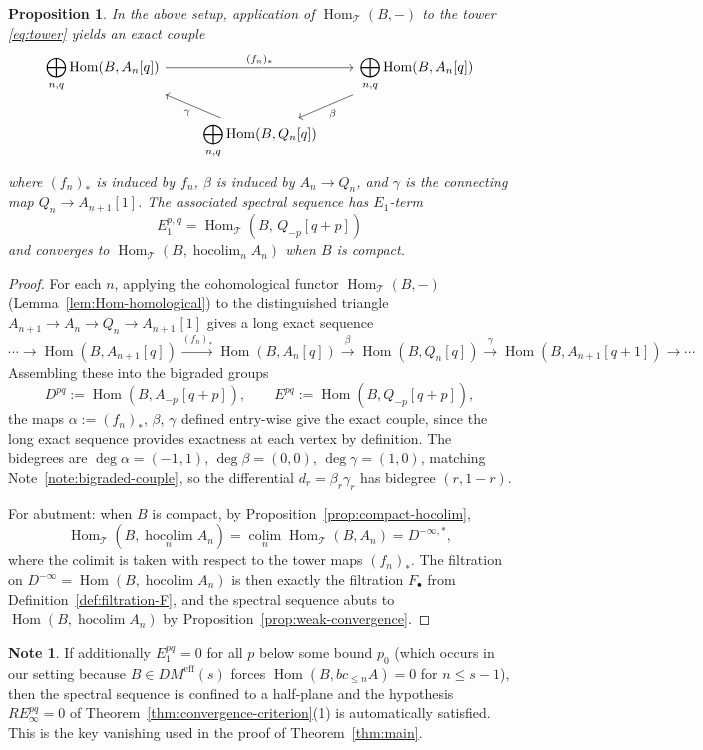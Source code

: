\documentclass[12pt,a4paper]{article}
\newtheorem{proposition}[theorem]{Proposition}
\theoremstyle{definition}
\newtheorem{note}[theorem]{Note}
\newcommand{\hocolim}{\operatorname*{hocolim}}
\newcommand{\colim}{\operatorname*{colim}}
\newcommand{\Hom}{\operatorname{Hom}}
\begin{document}
\begin{proposition}\label{prop:tower-SS}
In the above setup, application of $\Hom_{\mathcal{T}}(B,-)$ to the tower
\eqref{eq:tower} yields an exact couple
\[
\begin{tikzcd}[column sep=2.2em, row sep=1.6em]
  \displaystyle\bigoplus_{n,q}\Hom(B,A_n[q])
    \ar[rr,"(f_n)_*"] &&
  \displaystyle\bigoplus_{n,q}\Hom(B,A_n[q])
    \ar[dl,"\beta"] \\
  & \displaystyle\bigoplus_{n,q}\Hom(B,Q_n[q]) \ar[ul,"\gamma"] &
\end{tikzcd}
\]
where $(f_n)_*$ is induced by $f_n$, $\beta$ is induced by $A_n\to Q_n$, and
$\gamma$ is the connecting map $Q_n\to A_{n+1}[1]$.  The associated spectral
sequence has $E_1$-term
\[
  E_1^{p,q} = \Hom_{\mathcal{T}}(B,\,Q_{-p}[q+p])
\]
and converges to $\Hom_{\mathcal{T}}(B,\hocolim_n A_n)$ when $B$ is compact.
\end{proposition}
\begin{proof}
For each $n$, applying the cohomological functor $\Hom_\mathcal{T}(B,-)$
(Lemma~\ref{lem:Hom-homological}) to the distinguished triangle
$A_{n+1}\to A_n\to Q_n\to A_{n+1}[1]$ gives a long exact sequence
\[
\cdots\to\Hom(B,A_{n+1}[q])\xrightarrow{(f_n)_*}\Hom(B,A_n[q])
\xrightarrow{\beta}\Hom(B,Q_n[q])
\xrightarrow{\gamma}\Hom(B,A_{n+1}[q+1])\to\cdots
\]
Assembling these into the bigraded groups
\[
  D^{pq} := \Hom(B,A_{-p}[q+p]),\qquad
  E^{pq} := \Hom(B,Q_{-p}[q+p]),
\]
the maps $\alpha:=(f_n)_*$, $\beta$, $\gamma$ defined entry-wise give the exact
couple, since the long exact sequence provides exactness at each vertex by
definition.  The bidegrees are $\deg\alpha=(-1,1)$, $\deg\beta=(0,0)$,
$\deg\gamma=(1,0)$, matching Note~\ref{note:bigraded-couple}, so the differential
$d_r=\beta_r\gamma_r$ has bidegree $(r,1-r)$.

For abutment: when $B$ is compact, by Proposition~\ref{prop:compact-hocolim},
\[
  \Hom_\mathcal{T}(B,\hocolim_n A_n)
  = \colim_n\Hom_\mathcal{T}(B,A_n)
  = D^{-\infty,*},
\]
where the colimit is taken with respect to the tower maps $(f_n)_*$.  The
filtration on $D^{-\infty}=\Hom(B,\hocolim A_n)$ is then exactly the filtration
$F_\bullet$ from Definition~\ref{def:filtration-F}, and the spectral sequence abuts
to $\Hom(B,\hocolim A_n)$ by Proposition~\ref{prop:weak-convergence}.
\end{proof}

\begin{note}\label{note:tower-halfplane}
If additionally $E_1^{pq}=0$ for all $p$ below some bound $p_0$ (which occurs in
our setting because $B\in DM^{\mathrm{eff}}(s)$ forces
$\Hom(B,bc_{\leq n}A)=0$ for $n\leq s-1$), then the spectral sequence is confined
to a half-plane and the hypothesis $RE_\infty^{pq}=0$ of
Theorem~\ref{thm:convergence-criterion}(1) is automatically satisfied.  This is the
key vanishing used in the proof of Theorem~\ref{thm:main}.
\end{note}
\end{document}
